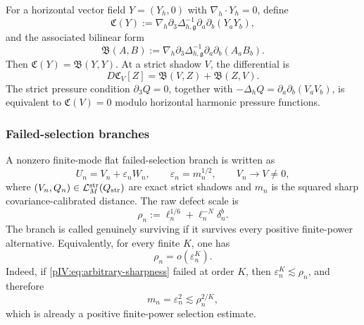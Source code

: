 \documentclass[11pt]{article}
\numberwithin{equation}{section}
\theoremstyle{plain}
\theoremstyle{definition}
\theoremstyle{remark}
\newcommand{\eps}{\varepsilon}
\newcommand{\nabh}{\nabla_h}
\newcommand{\divh}{\nabla_h\!\cdot}
\newcommand{\Lstr}{\mathcal L^{\rm str}}
\newcommand{\calB}{\mathfrak B}
\newcommand{\calC}{\mathfrak C}
\begin{document}
For a horizontal vector field \(Y=(Y_h,0)\) with \(\divh Y_h=0\), define
\begin{equation}\label{pIV:eq:C-def}
        \calC(Y):=\nabh\partial_3\Delta_{h,\mathfrak g}^{-1}\partial_a\partial_b(Y_aY_b),
\end{equation}
and the associated bilinear form
\begin{equation}\label{pIV:eq:B-def}
        \calB(A,B):=\nabh\partial_3\Delta_{h,\mathfrak g}^{-1}\partial_a\partial_b(A_aB_b).
\end{equation}
Then \(\calC(Y)=\calB(Y,Y)\).  At a strict shadow \(V\), the differential is
\begin{equation}\label{pIV:eq:linear-compatibility}
        D\calC_V[Z]=\calB(V,Z)+\calB(Z,V).
\end{equation}
The strict pressure condition \(\partial_3Q=0\), together with
\(-\Delta_hQ=\partial_a\partial_b(V_aV_b)\), is equivalent to \(\calC(V)=0\) modulo
horizontal harmonic pressure functions.

\subsubsection{Failed-selection branches}

A nonzero finite-mode flat failed-selection branch is written as
\begin{equation}\label{pIV:eq:branch}
        U_n=V_n+\eps_n W_n,
        \qquad
        \eps_n=m_n^{1/2},
        \qquad
        V_n\to V\ne0,
\end{equation}
where \((V_n,Q_n)\in\Lstr_M(Q_{\rm str})\) are exact strict shadows and \(m_n\) is
the squared sharp covariance-calibrated distance.  The raw defect scale is
\begin{equation}\label{pIV:eq:rho-n}
        \rho_n:=\ell_n^{1/6}+\ell_n^{-N}\delta_n^b.
\end{equation}
The branch is called genuinely surviving if it survives every positive finite-power
alternative.  Equivalently, for every finite \(K\), one has
\begin{equation}\label{pIV:eq:arbitrary-sharpness}
        \rho_n=o(\eps_n^K).
\end{equation}
Indeed, if \eqref{pIV:eq:arbitrary-sharpness} failed at order \(K\), then
\(\eps_n^K\lesssim \rho_n\), and therefore
\begin{equation}\label{pIV:eq:finite-power-from-sharpness-failure}
        m_n=\eps_n^2\lesssim \rho_n^{2/K},
\end{equation}
which is already a positive finite-power selection estimate.
\end{document}
